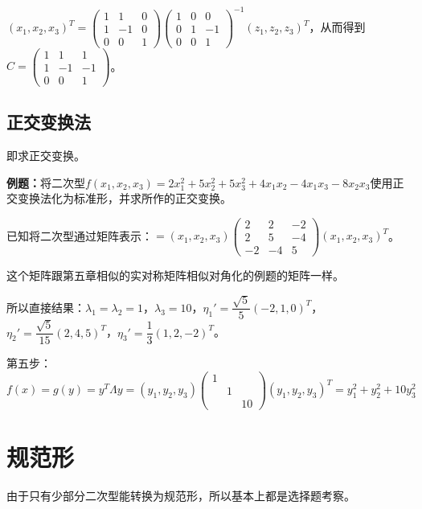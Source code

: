 \documentclass[UTF8, 12pt]{ctexart}
\begin{document}
$(x_1,x_2,x_3)^T=\left(\begin{array}{ccc}
    1 & 1 & 0 \\
    1 & -1 & 0 \\
    0 & 0 & 1
\end{array}\right)\left(\begin{array}{ccc}
    1 & 0 & 0 \\
    0 & 1 & -1 \\
    0 & 0 & 1
\end{array}\right)^{-1}(z_1,z_2,z_3)^T$，从而得到$C=\left(\begin{array}{ccc}
    1 & 1 & 1 \\
    1 & -1 & -1 \\
    0 & 0 & 1
\end{array}\right)$。

\subsection{正交变换法}

即求正交变换。

\textbf{例题：}将二次型$f(x_1,x_2,x_3)=2x_1^2+5x_2^2+5x_3^2+4x_1x_2-4x_1x_3-8x_2x_3$使用正交变换法化为标准形，并求所作的正交变换。

已知将二次型通过矩阵表示：$=(x_1,x_2,x_3)\left(\begin{array}{ccc}
    2 & 2 & -2 \\
    2 & 5 & -4 \\
    -2 & -4 & 5
\end{array}\right)(x_1,x_2,x_3)^T$。\medskip

这个矩阵跟第五章相似的实对称矩阵相似对角化的例题的矩阵一样。

所以直接结果：$\lambda_1=\lambda_2=1$，$\lambda_3=10$，$\eta_1'=\dfrac{\sqrt{5}}{5}(-2,1,0)^T$，$\eta_2'=\dfrac{\sqrt{5}}{15}(2,4,5)^T$，$\eta_3'=\dfrac{1}{3}(1,2,-2)^T$。

第五步：$f(x)=g(y)=y^T\Lambda y=(y_1,y_2,y_3)\left(\begin{array}{ccc}
    1 \\
     & 1 \\
     & & 10
\end{array}\right)(y_1,y_2,y_3)^T=y_1^2+y_2^2+10y_3^2$

\section{规范形}

由于只有少部分二次型能转换为规范形，所以基本上都是选择题考察。
\end{document}
